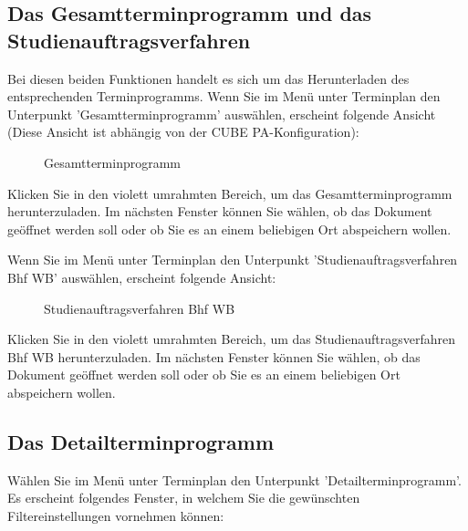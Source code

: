 \vspace{5cm} 

\subsection{Das Gesamtterminprogramm und das Studienauftragsverfahren}

Bei diesen beiden Funktionen handelt es sich um das Herunterladen des entsprechenden Terminprogramms.\newline
Wenn Sie im Menü unter Terminplan den Unterpunkt 'Gesamtterminprogramm' auswählen, erscheint folgende Ansicht (Diese Ansicht ist abhängig von der CUBE PA-Konfiguration):
\begin{figure}[H]
\caption{Gesamtterminprogramm}
\end{figure}

Klicken Sie in den violett umrahmten Bereich, um das Gesamtterminprogramm herunterzuladen. Im nächsten Fenster können Sie wählen, ob das Dokument geöffnet werden soll oder ob Sie es an einem beliebigen Ort abspeichern wollen.

\vspace{\baselineskip}

Wenn Sie im Menü unter Terminplan den Unterpunkt 'Studienauftragsverfahren Bhf WB' auswählen, erscheint folgende Ansicht:

\begin{figure}[H]
\caption{Studienauftragsverfahren Bhf WB}
\end{figure}

Klicken Sie in den violett umrahmten Bereich, um das Studienauftragsverfahren Bhf WB herunterzuladen. Im nächsten Fenster können Sie wählen, ob das Dokument geöffnet werden soll oder ob Sie es an einem beliebigen Ort abspeichern wollen.

\subsection{Das Detailterminprogramm}

Wählen Sie im Menü unter Terminplan den Unterpunkt 'Detailterminprogramm'. Es erscheint folgendes Fenster, in welchem Sie die gewünschten Filtereinstellungen vornehmen können:

